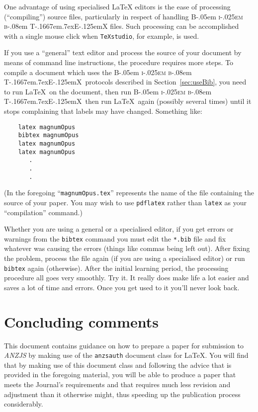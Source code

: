 \documentclass[times, doublespace]{anzsauth}
\newcommand\BibTeX{{\rmfamily B\kern-.05em \textsc{i\kern-.025em b}\kern-.08em
T\kern-.1667em\lower.7ex\hbox{E}\kern-.125emX}}
\begin{document}
One advantage of using specialised \LaTeX{} editors is the ease of
processing (``compiling'') source files, particularly in respect of
handling \BibTeX{} files. Such processing can be accomplished with
a single mouse click when \texttt{TeXstudio}, for example, is used.

If you use a ``general'' text editor and process the source
of your document by means of command line instructions, the procedure
requires more steps.  To compile a document which uses the \BibTeX\
protocols described in Section~\ref{sec:useBib}, you need to run
\LaTeX\ on the document, then run \BibTeX\, then run \LaTeX\ again
(possibly several times) until it stops complaining that labels
may have changed.  Something like:
\begin{verbatim}
    latex magnumOpus
    bibtex magnumOpus
    latex magnumOpus
    latex magnumOpus
       .
       .
       .
\end{verbatim}
(In the foregoing ``\texttt{magnumOpus.tex}'' represents the
name of the file containing the source of your paper.  You may
wish to use \texttt{pdflatex} rather than \texttt{latex} as your
``compilation'' command.)

Whether you are using a general or a specialised editor, if you get
errors or warnings from the \texttt{bibtex} command you must edit
the \texttt{*.bib} file and fix whatever was causing the errors
(things like commas being left out).  After fixing the problem,
process the file again (if you are using a specialised editor)
or run \texttt{bibtex} again (otherwise).  After the initial
learning period, the processing procedure all goes very smoothly.
Try it. It really does make life a lot easier and saves a lot of
time and errors. Once you get used to it you'll never look back.

\section{Concluding comments}
\label{sec:concComm}

This document contains guidance on how to prepare a paper for
submission to \textit{ANZJS} by making use of the \texttt{anzsauth}
document class for \LaTeX.  You will find that by making use of this
document class and following the advice that is provided in the
foregoing material, you will be able to produce a paper that meets
the Journal's requirements and that requires much less revision and
adjustment than it otherwise might, thus speeding up the publication
process considerably.
\end{document}
